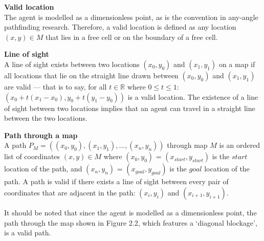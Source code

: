 \documentclass[12pt,notitlepage]{report}
\begin{document}
\begin{description}
\item{\bfseries Valid location}\\
The agent is modelled as a dimensionless point, as is the convention\cite{Daniel10}  in any-angle pathfinding research. Therefore, a valid location is defined as any location $(x,y) \in M$ that lies in a free cell or on the boundary of a free cell.
\end{description}

\begin{description}
\item{\bfseries Line of sight}\\
A line of sight exists between two locations $(x_{0},y_{0})$ and $(x_{1},y_{1})$ on a map if all locations that lie on the straight line drawn between $(x_{0},y_{0})$ and $(x_{1},y_{1})$ are valid --- that is to say, for all $t \in \mathbb{R}$ where $0 \leq t \leq 1$: $(x_{0} + t(x_{1}-x_{0}),y_{0} + t(y_{1}-y_{0}))$ is a valid location. The existence of a line of sight between two locations implies that an agent can travel in a straight line between the two locations.
\end{description}

\begin{description}
\item{\bfseries Path through a map}\\
A path  $P_{M} = ((x_{0},y_{0}), (x_{1},y_{1}), \ldots, (x_{n},y_{n}))$ through map $M$ is an ordered list of coordinates $(x,y) \in M$ where $(x_{0},y_{0})$ = $(x_{start},y_{start})$ is the $start$ location of the path, and $(x_{n},y_{n})$ = $(x_{goal},y_{goal})$ is the $goal$ location of the path. A path is valid if there exists a line of sight between every pair of coordinates that are adjacent in the path: $(x_{i},y_{i})$ and $(x_{i+1},y_{i+1})$.

\noindent
It should be noted that since the agent is modelled as a dimensionless point, the path through the map shown in Figure 2.2, which features a `diagonal blockage', is a valid path.\\

\end{description}
\end{document}
